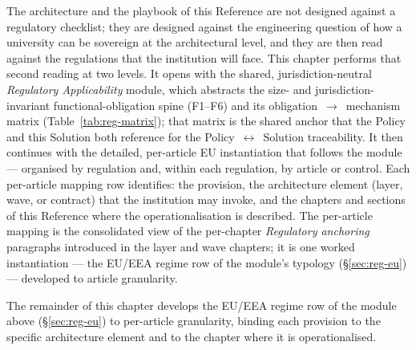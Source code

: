 The architecture and the playbook of this Reference are not
designed against a regulatory checklist; they are designed against
the engineering question of how a university
can be sovereign at the architectural level, and they are then
read against the regulations that the institution will face. This
chapter performs that second reading at two levels. It opens with the
shared, jurisdiction-neutral \emph{Regulatory Applicability} module,
which abstracts the size- and jurisdiction-invariant
functional-obligation spine (F1--F6) and its
obligation~$\rightarrow$~mechanism matrix
(Table~\ref{tab:reg-matrix}); that matrix is the shared anchor that the
Policy and this Solution both reference for the
Policy~$\leftrightarrow$~Solution traceability. It then continues with
the detailed, per-article EU instantiation that follows the module ---
organised by regulation and, within each regulation, by article or
control. Each per-article mapping row identifies: the provision, the
architecture element (layer, wave, or contract) that the institution
may invoke, and the chapters and sections of this Reference where the
operationalisation is described. The per-article mapping is the
consolidated view of the per-chapter \emph{Regulatory anchoring}
paragraphs introduced in the layer and wave chapters; it is one worked
instantiation --- the EU/EEA regime row of the module's typology
(\S\ref{sec:reg-eu}) --- developed to article granularity.



\bigskip
\noindent The remainder of this chapter develops the EU/EEA regime row
of the module above (\S\ref{sec:reg-eu}) to per-article granularity,
binding each provision to the specific architecture element and to the
chapter where it is operationalised.

